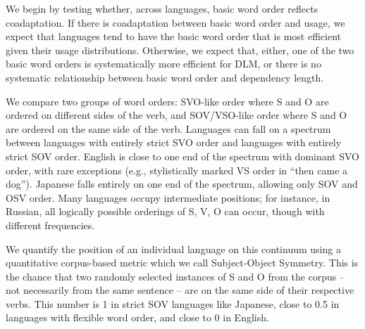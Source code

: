 \documentclass[11pt,a4paper]{article}
\newcommand\mhahn[1]{{\color{red}(#1)}}
\begin{document}
We begin by testing whether, across languages, basic word order reflects coadaptation.
If there is coadaptation between basic word order and usage, we expect that languages tend to have the basic word order that is most efficient given their usage distributions.
Otherwise, we expect that, either, one of the two basic word orders is systematically more efficient for DLM, or there is no systematic relationship between basic word order and dependency length.




We compare two groups of word orders: SVO-like order where S and O are ordered on different sides of the verb, and SOV/VSO-like order where S and O are ordered on the same side of the verb.
Languages can fall on a spectrum between languages with entirely strict SVO order and languages with entirely strict SOV order.
English is close to one end of the spectrum with dominant SVO order, with rare exceptions (e.g., stylistically marked VS order in ``then came a dog'').
Japanese falls entirely on one end of the spectrum, allowing only SOV and OSV order.
Many languages occupy intermediate positions; for instance, in Russian, all logically possible orderings of S, V, O can occur, though with different frequencies.

We quantify the position of an individual language on this continuum using a quantitative corpus-based metric which we call {Subject-Object Symmetry}.
This is the chance that two randomly selected instances of S and O from the corpus -- not necessarily from the same sentence -- are on the same side of their respective verbs. This number is 1 in strict SOV languages like Japanese, close to 0.5 in languages with flexible word order, and close to 0 in English.

\end{document}
